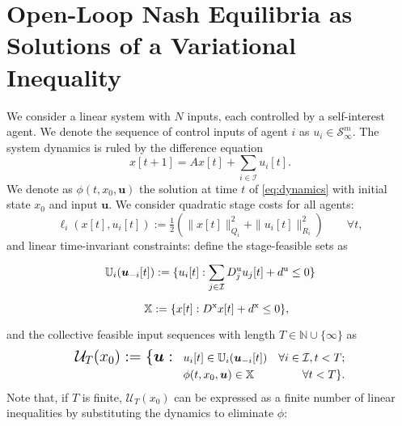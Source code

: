 \documentclass[letterpaper, 10 pt, conference]{ieeeconf}  %
\newcommand{\N}{\mathbb{N}}
\newcommand{\mc}{\mathcal}
\newcommand{\bu}{\boldsymbol{u}}
\newcommand{\Dx}{D^{\text{x}}}
\newcommand{\Du}{D^{\text{u}}}
\newcommand{\dx}{d^{\text{x}}}
\newcommand{\du}{d^{\text{u}}}
\newcommand{\X}{\mathbb{X}}
\newcommand{\U}{\mathbb{U}}
\begin{document}
\section{Open-Loop Nash Equilibria as Solutions of a Variational Inequality}\label{sec: OL-NE as VI}
We consider a linear system with $N$ inputs, each controlled by a self-interest agent. We denote the sequence of control inputs of agent $i$ as $u_i \in \mc S_{\infty}^m$. The system dynamics is ruled by the difference equation
\begin{equation}\label{eq:dynamics}
    x[t+1] = Ax[t] + \sum_{i\in\mc I} u_i[t].
\end{equation} 
We denote as $\phi(t, x_0, \bu)$ the solution at time $t$ of \eqref{eq:dynamics} with initial state $x_0$ and input $\bu$. We consider quadratic stage costs for all agents:
\begin{equation}
    \ell_i(x[t],u_i[t]):= \tfrac{1}{2}(\|x[t]\|^2_{Q_i} + \|u_i[t]\|^2_{R_i}) \qquad \forall t,
\end{equation}
and linear time-invariant constraints: define the stage-feasible sets as
\begin{align}
    \mathbb{U}_i(\bu_{-i}[t]):=\Large\{ u_i[t]: \sum_{j\in \mc I} \Du_j u_j[t] + \du &\leq 0 \Large\} \\
    \mathbb{X}:= \{x[t]: \Dx x[t]+ \dx \leq 0 \},
\end{align}
and the collective feasible input sequences with length $T\in\N\cup\{\infty\}$ as 
\begin{align*}
        \mc{U}_T(x_0):= \large\{ \bu:~~ &u_i[t] \in \U_i(\bu_{-i}[t]) &\forall i\in\mc I,t<T; \\
         &\phi(t,x_0,\bu) \in\X &\forall t<T\large\}.
\end{align*}
Note that, if $T$ is finite, $\mc U_T(x_0)$ can be expressed as a finite number of linear inequalities by substituting the dynamics to eliminate $\phi$: 
\end{document}
